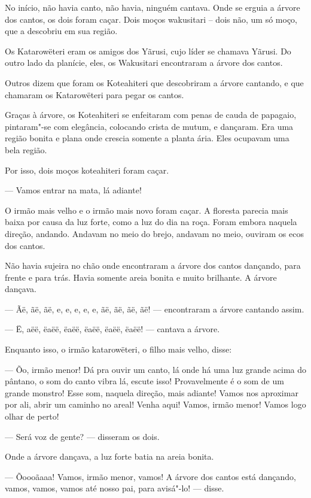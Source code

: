 

 No início, não havia canto, não havia, ninguém
cantava. Onde se erguia a árvore dos cantos, os dois foram caçar. Dois
moços wakusitari -- dois não, um só moço, que a descobriu em sua região.

Os Katarowëteri eram os amigos dos Yãrusi, cujo líder se chamava Yãrusi.
Do outro lado da planície, eles, os Wakusitari encontraram a árvore dos
cantos. 

Outros dizem que foram os Koteahiteri que descobriram a árvore cantando,
e que chamaram os Katarowëteri para pegar os cantos. 

Graças à árvore, os Koteahiteri se enfeitaram com penas de cauda de
papagaio, pintaram"-se com elegância, colocando crista de mutum, e
dançaram. Era uma região bonita e plana onde crescia somente a planta
ária. Eles ocupavam uma bela região. 

Por isso, dois moços koteahiteri foram caçar. 

--- Vamos entrar na mata, lá adiante! 

O irmão mais velho e o irmão mais novo foram caçar. A floresta parecia
mais baixa por causa da luz forte, como a luz do dia na roça. Foram
embora naquela direção, andando. Andavam no meio do brejo, andavam no
meio, ouviram os ecos dos cantos. 

Não havia sujeira no chão onde encontraram a árvore dos cantos dançando,
para frente e para trás. Havia somente areia bonita e muito brilhante. A
árvore dançava. 

--- Ãë, ãë, ãë, e, e, e, e, e, ãë, ãë, ãë, ãë! --- encontraram a árvore
cantando assim. 

--- Ë, aëë, ëaëë, ëaëë, ëaëë, ëaëë, ëaëë! --- cantava a árvore. 

Enquanto isso, o irmão katarowëteri, o filho mais velho, disse: 

--- Õo, irmão menor! Dá pra ouvir um canto, lá onde há uma luz grande
acima do pântano, o som do canto vibra lá, escute isso! Provavelmente é
o som de um grande monstro! Esse som, naquela direção, mais adiante!
Vamos nos aproximar por ali, abrir um caminho no areal! Venha aqui!
Vamos, irmão menor! Vamos logo olhar de perto! 

--- Será voz de gente? --- disseram os dois. 

Onde a árvore dançava, a luz forte batia na areia bonita. 

--- Õoooãaaa! Vamos, irmão menor, vamos! A árvore dos cantos está
dançando, vamos, vamos, vamos até nosso pai, para avisá"-lo! --- disse. 

